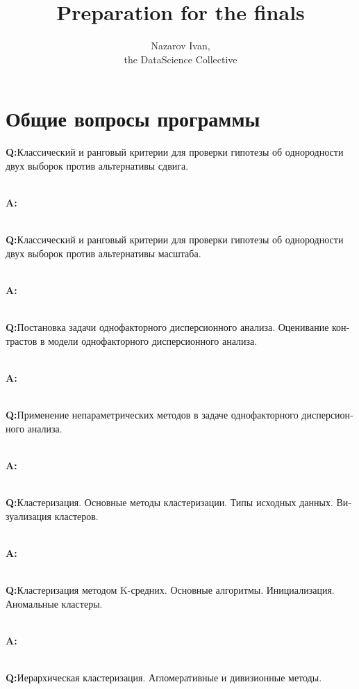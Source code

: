 \documentclass[a4paper]{article}
\title{Preparation for the finals}
\author{Nazarov Ivan, \rus{101мНОД(ИССА)}\\the DataScience Collective}
\newcommand{\rus}[1]{\foreignlanguage{russian}{#1}}
\begin{document}
\maketitle


\section{\rus{Общие вопросы программы}} %
\label{sec:general_questions}
\noindent\textbf{Q:}\rus{Классический и ранговый критерии для проверки гипотезы об
однородности двух выборок против альтернативы сдвига.}

\hfill\\\noindent\textbf{A:}

\hfill\\\noindent\textbf{Q:}\rus{Классический и ранговый критерии для проверки гипотезы
об однородности двух выборок против альтернативы масштаба.}

\hfill\\\noindent\textbf{A:}

\hfill\\\noindent\textbf{Q:}\rus{Постановка задачи однофакторного дисперсионного
анализа. Оценивание контрастов в модели однофакторного дисперсионного анализа.}

\hfill\\\noindent\textbf{A:}

\hfill\\\noindent\textbf{Q:}\rus{Применение непараметрических методов в задаче однофакторного
дисперсионного анализа.}

\hfill\\\noindent\textbf{A:}

\hfill\\\noindent\textbf{Q:}\rus{Кластеризация. Основные методы кластеризации.
Типы исходных данных. Визуализация кластеров.}

\hfill\\\noindent\textbf{A:}

\hfill\\\noindent\textbf{Q:}\rus{Кластеризация методом K-средних. Основные алгоритмы.
Инициализация. Аномальные кластеры.}

\hfill\\\noindent\textbf{A:}

\hfill\\\noindent\textbf{Q:}\rus{Иерархическая кластеризация. Агломеративные и
дивизионные методы.}
\end{document}
